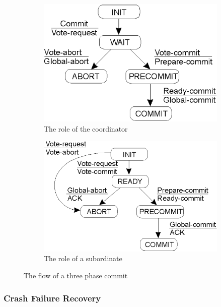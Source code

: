 \documentclass[twoside]{article}
\begin{document}
\begin{figure}[h]
    \centering
    \begin{subfigure}{.5\textwidth}
        \includegraphics[width=\textwidth]{three-phase-commit-coordinator-diagram.png}
    	\caption{The role of the coordinator}
    	\label{fig:three-phase-commit-coordinator-diagram}
    \end{subfigure}%
    \begin{subfigure}{.5\textwidth}
        \includegraphics[width=\textwidth]{three-phase-commit-subordinate-diagram.png}
    	\caption{The role of a subordinate}
    	\label{fig:three-phase-commit-subordinate-diagram}
    \end{subfigure}
    \caption{The flow of a three phase commit}
\end{figure}

\subsubsection{Crash Failure Recovery}
\end{document}
